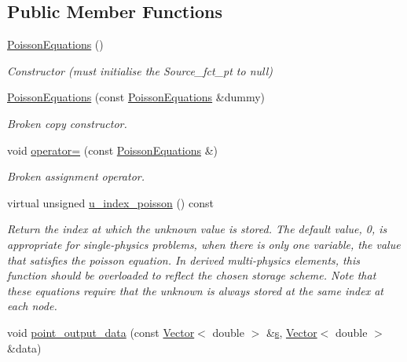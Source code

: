 \subsection*{Public Member Functions}
\begin{DoxyCompactItemize}
\item 
\hyperlink{classoomph_1_1PoissonEquations_a338ad18dee2ce6f7afb55211b66b1634}{Poisson\+Equations} ()
\begin{DoxyCompactList}\small\item\em Constructor (must initialise the Source\+\_\+fct\+\_\+pt to null) \end{DoxyCompactList}\item 
\hyperlink{classoomph_1_1PoissonEquations_ad41c83d9d92cb124d50b24dc237854cf}{Poisson\+Equations} (const \hyperlink{classoomph_1_1PoissonEquations}{Poisson\+Equations} \&dummy)
\begin{DoxyCompactList}\small\item\em Broken copy constructor. \end{DoxyCompactList}\item 
void \hyperlink{classoomph_1_1PoissonEquations_a80817f45bd1db3758570964f11dd5c74}{operator=} (const \hyperlink{classoomph_1_1PoissonEquations}{Poisson\+Equations} \&)
\begin{DoxyCompactList}\small\item\em Broken assignment operator. \end{DoxyCompactList}\item 
virtual unsigned \hyperlink{classoomph_1_1PoissonEquations_ae2e4e133bde4c4cbddf00de6c4feb72c}{u\+\_\+index\+\_\+poisson} () const
\begin{DoxyCompactList}\small\item\em Return the index at which the unknown value is stored. The default value, 0, is appropriate for single-\/physics problems, when there is only one variable, the value that satisfies the poisson equation. In derived multi-\/physics elements, this function should be overloaded to reflect the chosen storage scheme. Note that these equations require that the unknown is always stored at the same index at each node. \end{DoxyCompactList}\item 
void \hyperlink{classoomph_1_1PoissonEquations_a03685536047faa97412f86030ffd91cb}{point\+\_\+output\+\_\+data} (const \hyperlink{classoomph_1_1Vector}{Vector}$<$ double $>$ \&\hyperlink{cfortran_8h_ab7123126e4885ef647dd9c6e3807a21c}{s}, \hyperlink{classoomph_1_1Vector}{Vector}$<$ double $>$ \&data)

\end{DoxyCompactItemize}
